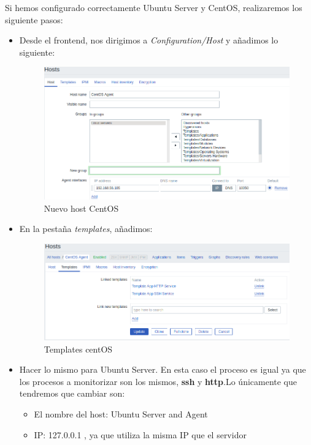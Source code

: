\newpage
Si hemos configurado correctamente Ubuntu Server y CentOS, realizaremos los siguiente pasos:


\begin{itemize}
	\item Desde el frontend, nos dirigimos a \textit{Configuration/Host} y añadimos lo siguiente:
	 \begin{figure}[h]
	 	\centering
	 	\includegraphics[scale=0.4]{images/cent.png}
	 	\caption{Nuevo host CentOS}
	 \end{figure}
	
	\item En la pestaña \textit{templates}, añadimos:
	\begin{figure}[h]
		\centering
		\includegraphics[scale=0.45]{images/biencent.png}
		\caption{Templates centOS}
	\end{figure}
	\item Hacer lo mismo para Ubuntu Server. En esta caso el proceso es igual ya que los procesos a monitorizar son los mismos, \textbf{ssh} y \textbf{http}.Lo únicamente que tendremos que cambiar son:
	
	\begin{itemize}
		\item El nombre del host: Ubuntu Server and Agent
		\item IP: 127.0.0.1 , ya que utiliza la misma IP que el servidor
	\end{itemize}
	
	
\end{itemize}



